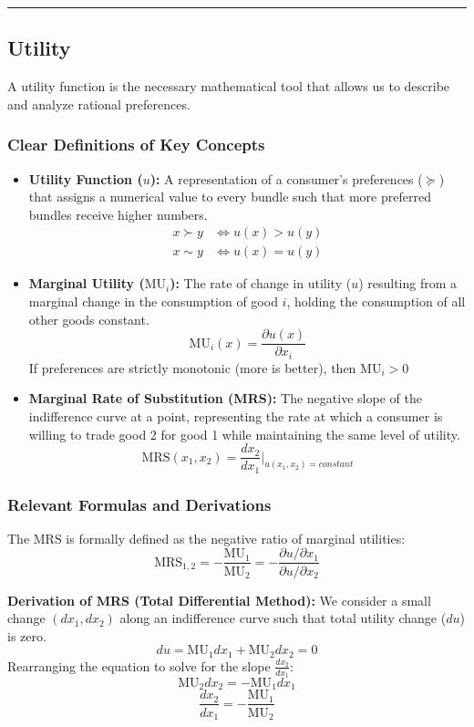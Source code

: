 \documentclass{article}
\begin{document}
\noindent\rule{\linewidth}{0.4pt}

\subsection{Utility}

A utility function is the necessary mathematical tool that allows us to describe and analyze rational preferences.

\subsubsection*{Clear Definitions of Key Concepts}
\begin{itemize}
    \item \textbf{Utility Function ($u$):} A representation of a consumer's preferences ($\succeq$) that assigns a numerical value to every bundle such that more preferred bundles receive higher numbers. \begin{align*} x \succ y &\iff u(x) > u(y) \\ x \sim y &\iff u(x) = u(y) \end{align*}

    \item \textbf{Marginal Utility ($\text{MU}_i$):} The rate of change in utility ($u$) resulting from a marginal change in the consumption of good $i$, holding the consumption of all other goods constant. \[\text{MU}_i(x) = \frac{\partial u(x)}{\partial x_i}\] If preferences are strictly monotonic (more is better), then $\text{MU}_i > 0$

    \item \textbf{Marginal Rate of Substitution (MRS):} The negative slope of the indifference curve at a point, representing the rate at which a consumer is willing to trade good 2 for good 1 while maintaining the same level of utility. \[\text{MRS}(x_1, x_2) = \frac{dx_2}{dx_1} \bigg\rvert_{u(x_1, x_2)=constant}\]
\end{itemize}

\subsubsection*{Relevant Formulas and Derivations}

The MRS is formally defined as the negative ratio of marginal utilities: \[\text{MRS}_{1,2} = -\frac{\text{MU}_1}{\text{MU}_2} = -\frac{\partial u/\partial x_1}{\partial u/\partial x_2}\]

\textbf{Derivation of MRS (Total Differential Method):} We consider a small change $(dx_1, dx_2)$ along an indifference curve such that total utility change ($du$) is zero. \[du = \text{MU}_1 dx_1 + \text{MU}_2 dx_2 = 0\] Rearranging the equation to solve for the slope $\frac{dx_2}{dx_1}: $\[\text{MU}_2 dx_2 = -\text{MU}_1 dx_1\] \[\frac{dx_2}{dx_1} = -\frac{\text{MU}_1}{\text{MU}_2}\]
\end{document}
